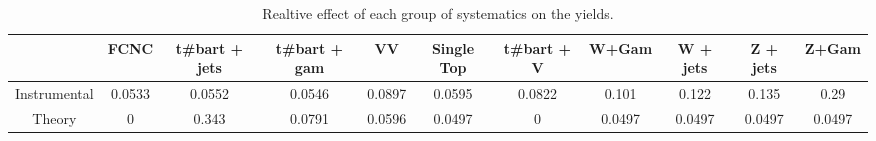 \begin{table}[htbp]
\begin{center}
\begin{tabular}{|c|c|c|c|c|c|c|c|c|c|c|}
\hline 
      & FCNC      & t#bar{t} + jets      & t#bar{t} +  gam      & VV      & Single Top      & t#bar{t} + V      & W+Gam      & W + jets      & Z + jets      & Z+Gam \\ 
\hline 
 Instrumental & 0.0533 & 0.0552 & 0.0546 & 0.0897 & 0.0595 & 0.0822 & 0.101 & 0.122 & 0.135 & 0.29 \\ 
 Theory & 0 & 0.343 & 0.0791 & 0.0596 & 0.0497 & 0 & 0.0497 & 0.0497 & 0.0497 & 0.0497 \\ 
\hline 
\end{tabular} 
\caption{Realtive effect of each group of systematics on the yields.} 
\end{center} 
\end{table} 
